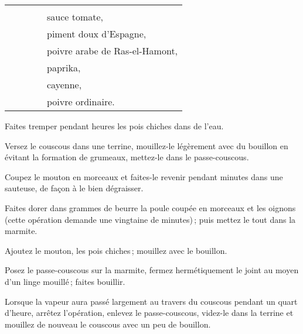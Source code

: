 \begin{tabular}{@{}lrrrp{16em}}
\hspace{2em} &       &          &    &                                                                    \\
\hspace{2em} &       &          &    & sauce tomate,                                                      \\
\hspace{2em} &       &          &    & piment doux d'Espagne,                                             \\
\hspace{2em} &       &          &    & poivre arabe de Ras-el-Hamont,                                     \\
\hspace{2em} &       &          &    & paprika,                                                           \\
\hspace{2em} &       &          &    & cayenne,                                                           \\
\hspace{2em} &       &          &    & poivre ordinaire.                                                  \\
\end{tabular}
\normalsize

\medskip

Faites tremper pendant {\mmm} heures les pois chiches dans de l'eau.

Versez le couscous dans une terrine, mouillez-le légèrement avec du bouillon en
évitant la formation de grumeaux, mettez-le dans le passe-couscous.

Coupez le mouton en morceaux et faites-le revenir pendant {\mmm} minutes
dans une sauteuse, de façon à le bien dégraisser.

Faites dorer dans {\mmm} grammes de beurre la poule coupée en morceaux
et les oignons (cette opération demande une vingtaine de minutes) ; puis mettez
le tout dans la marmite.

Ajoutez le mouton, les pois chiches ; mouillez avec le bouillon.

Posez le passe-couscous sur la marmite, fermez hermétiquement le joint au moyen
d'un linge mouillé ; faites bouillir.

Lorsque la vapeur aura passé largement au travers du couscous pendant un quart
d'heure, arrêtez l'opération, enlevez le passe-couscous, videz-le dans la
terrine et mouillez de nouveau le couscous avec un peu de bouillon.

